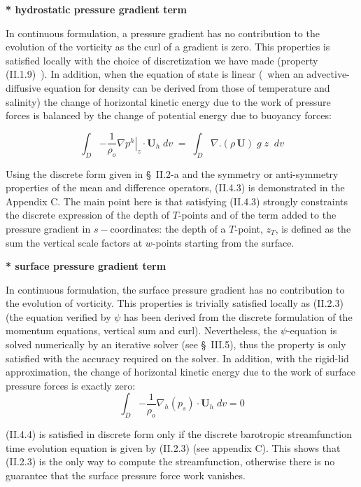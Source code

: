 \documentclass[../main/NEMO_manual]{subfiles}
\begin{document}
\textbf{* hydrostatic pressure gradient term}

In continuous formulation, a pressure gradient has no contribution to the evolution of the vorticity as
the curl of a gradient is zero.
This properties is satisfied locally with the choice of discretization we have made (property (II.1.9)~).
In addition, when the equation of state is linear
(\ie\ when an advective-diffusive equation for density can be derived from those of temperature and salinity)
the change of horizontal kinetic energy due to the work of pressure forces is balanced by the change of
potential energy due to buoyancy forces:

\[
  \int_D {-\frac{1}{\rho_o }\left. {\nabla p^h} \right|_z \cdot {\textbf {U}}_h \;dv} \;=\;\int_D {\nabla .\left( {\rho \,{\textbf{U}}} \right)\;g\;z\;\;dv}
\]

Using the discrete form given in {\S}~II.2-a and the symmetry or anti-symmetry properties of
the mean and difference operators, (II.4.3) is demonstrated in the Appendix C.
The main point here is that satisfying (II.4.3) strongly constraints the discrete expression of the depth of
$T$-points and of the term added to the pressure gradient in $s-$coordinates: the depth of a $T$-point, $z_T$,
is defined as the sum the vertical scale factors at $w$-points starting from the surface.

\textbf{* surface pressure gradient term}

In continuous formulation, the surface pressure gradient has no contribution to the evolution of vorticity.
This properties is trivially satisfied locally as (II.2.3)
(the equation verified by $\psi$ has been derived from the discrete formulation of the momentum equations,
vertical sum and curl).
Nevertheless, the $\psi$-equation is solved numerically by an iterative solver (see {\S}~III.5),
thus the property is only satisfied with the accuracy required on the solver.
In addition, with the rigid-lid approximation, the change of horizontal kinetic energy due to the work of
surface pressure forces is exactly zero:
\[
  \int_D {-\frac{1}{\rho_o }\nabla _h } \left( {p_s } \right)\cdot {\textbf{U}}_h \;dv=0
\]

(II.4.4) is satisfied in discrete form only if
the discrete barotropic streamfunction time evolution equation is given by (II.2.3) (see appendix C).
This shows that (II.2.3) is the only way to compute the streamfunction,
otherwise there is no guarantee that the surface pressure force work vanishes.
\end{document}
